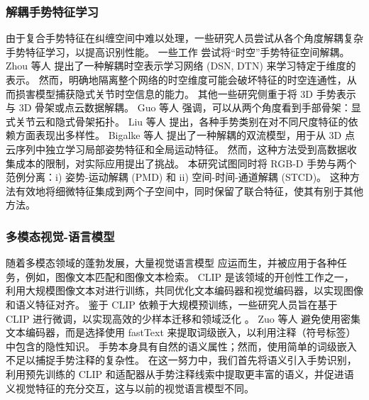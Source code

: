 
\subsubsection{解耦手势特征学习}
由于复合手势特征在纠缠空间\cite{zhou2023unified,LI2024110536}中难以处理，一些研究人员尝试从各个角度解耦复杂手势特征学习，以提高识别性能。
一些工作\cite{zhou2022decoupling,LI2024110536} 尝试将“时空”手势特征空间解耦。
Zhou 等人 \cite{zhou2023unified} 提出了一种解耦时空表示学习网络 (DSN, DTN) 来学习特定于维度的表示。
然而，明确地隔离整个网络的时空维度可能会破坏特征的时空连通性，从而损害模型捕获隐式关节时空信息的能力。
其他一些研究侧重于将 3D 手势表示与 3D 骨架或点云数据解耦。
Guo 等人 \cite{GUO2021108044} 强调，可以从两个角度看到手部骨架：显式关节云和隐式骨架拓扑。
Liu 等人\cite{liu2020decoupled} 提出，各种手势类别在对不同尺度特征的依赖方面表现出多样性。
Bigalke 等人 \cite{bigalke2021fusing} 提出了一种解耦的双流模型，用于从 3D 点云序列中独立学习局部姿势特征和全局运动特征。
然而，这种方法受到高数据收集成本的限制，对实际应用提出了挑战。
本研究试图同时将 RGB-D 手势与两个范例分离：i) 姿势-运动解耦 (PMD) 和 ii) 空间-时间-通道解耦 (STCD)。
这种方法有效地将细微特征集成到两个子空间中，同时保留了联合特征，使其有别于其他方法。

\subsubsection{多模态视觉-语言模型}
随着多模态领域的蓬勃发展，大量视觉语言模型 \cite{radford2021learning, li2022blip} 应运而生，并被应用于各种任务，例如，图像文本匹配和图像文本检索。
CLIP \cite{radford2021learning} 是该领域的开创性工作之一，利用大规模图像文本对进行训练，共同优化文本编码器和视觉编码器，以实现图像和语义特征对齐。
鉴于 CLIP 依赖于大规模预训练，一些研究人员旨在基于 CLIP 进行微调，以实现高效的少样本迁移和领域泛化 \cite{gao2024clip}。
Zuo 等人 \cite{zuo2023natural} 避免使用密集文本编码器，而是选择使用 fastText 来提取词级嵌入，以利用注释（符号标签）中包含的隐性知识。
手势本身具有自然的语义属性；然而，使用简单的词级嵌入不足以捕捉手势注释的复杂性。
在这一努力中，我们首先将语义引入手势识别，利用预先训练的 CLIP 和适配器从手势注释线索中提取更丰富的语义，并促进语义视觉特征的充分交互，这与以前的视觉语言模型不同。


